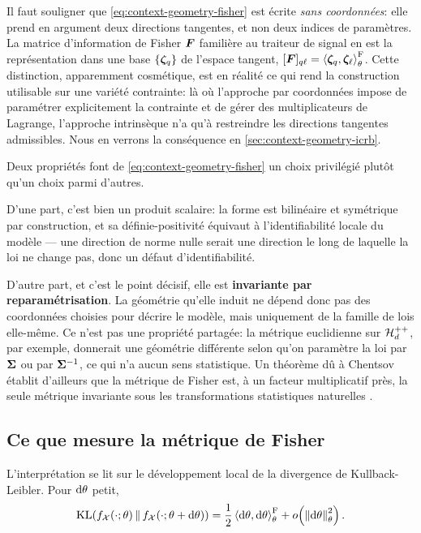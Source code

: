 \begin{remark}
\label{rem:context-geometry-sanscoord}
  Il faut souligner que \cref{eq:context-geometry-fisher} est écrite \emph{sans coordonnées}: elle prend en argument deux directions tangentes, et non deux indices de paramètres. La matrice d'information de Fisher $\boldsymbol{F}$ familière au traiteur de signal en est la représentation dans une base $\{\boldsymbol{\zeta}_q\}$ de l'espace tangent, $[\boldsymbol{F}]_{q\ell}=\left\langle \boldsymbol{\zeta}_q, \boldsymbol{\zeta}_\ell \right\rangle_{\theta}^{\mathrm{F}}$. Cette distinction, apparemment cosmétique, est en réalité ce qui rend la construction utilisable sur une variété contrainte: là où l'approche par coordonnées impose de paramétrer explicitement la contrainte et de gérer des multiplicateurs de Lagrange, l'approche intrinsèque n'a qu'à restreindre les directions tangentes admissibles. Nous en verrons la conséquence en \cref{sec:context-geometry-icrb}.
\end{remark}

Deux propriétés font de \cref{eq:context-geometry-fisher} un choix privilégié plutôt qu'un choix parmi d'autres.

D'une part, c'est bien un produit scalaire: la forme est bilinéaire et symétrique par construction, et sa définie-positivité équivaut à l'identifiabilité locale du modèle --- une direction de norme nulle serait une direction le long de laquelle la loi ne change pas, donc un défaut d'identifiabilité.

D'autre part, et c'est le point décisif, elle est \textbf{invariante par reparamétrisation}. La géométrie qu'elle induit ne dépend donc pas des coordonnées choisies pour décrire le modèle, mais uniquement de la famille de lois elle-même. Ce n'est pas une propriété partagée: la métrique euclidienne sur $\mathcal{H}_{d}^{++}$, par exemple, donnerait une géométrie différente selon qu'on paramètre la loi par $\boldsymbol{\Sigma}$ ou par ${\boldsymbol{\Sigma}}^{-1}$, ce qui n'a aucun sens statistique. Un théorème dû à Chentsov établit d'ailleurs que la métrique de Fisher est, à un facteur multiplicatif près, la seule métrique invariante sous les transformations statistiques naturelles .

\subsection{Ce que mesure la métrique de Fisher}

L'interprétation se lit sur le développement local de la divergence de Kullback-Leibler. Pour $\mathrm{d}\theta$ petit,
\begin{equation}
  \mathrm{KL}\!\left(f_{\mathcal{X}}(\cdot;\theta)\,\|\,f_{\mathcal{X}}(\cdot;\theta+\mathrm{d}\theta)\right)
  =
  \frac{1}{2}\left\langle \mathrm{d}\theta, \mathrm{d}\theta \right\rangle_{\theta}^{\mathrm{F}}
  + o\!\left(\left\lVert \mathrm{d}\theta \right\rVert_{\theta}^2\right).
  \label{eq:context-geometry-kl}
\end{equation}

